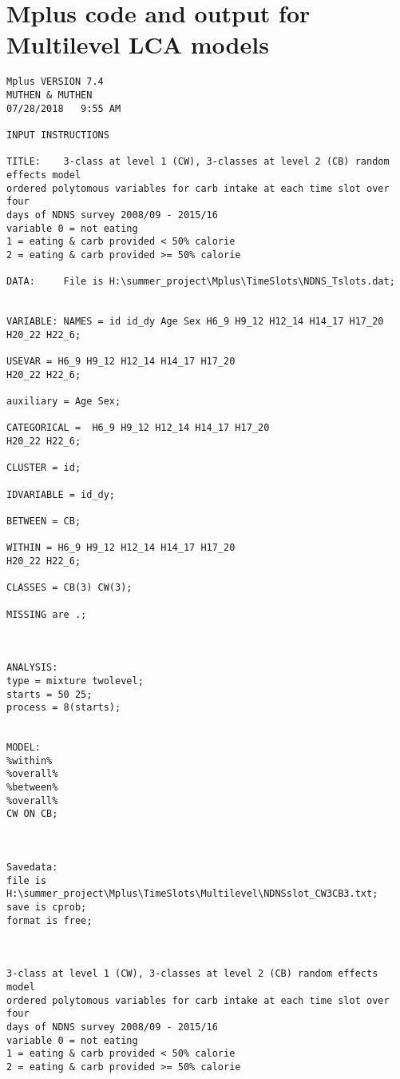 
\chapter{Mplus code and output for Multilevel LCA models} %

\label{AppendixB} %



\begin{verbatim}
Mplus VERSION 7.4
MUTHEN & MUTHEN
07/28/2018   9:55 AM

INPUT INSTRUCTIONS

TITLE:    3-class at level 1 (CW), 3-classes at level 2 (CB) random effects model 
ordered polytomous variables for carb intake at each time slot over four
days of NDNS survey 2008/09 - 2015/16
variable 0 = not eating
1 = eating & carb provided < 50% calorie
2 = eating & carb provided >= 50% calorie

DATA:     File is H:\summer_project\Mplus\TimeSlots\NDNS_Tslots.dat;


VARIABLE: NAMES = id id_dy Age Sex H6_9 H9_12 H12_14 H14_17 H17_20
H20_22 H22_6;

USEVAR = H6_9 H9_12 H12_14 H14_17 H17_20
H20_22 H22_6;

auxiliary = Age Sex;

CATEGORICAL =  H6_9 H9_12 H12_14 H14_17 H17_20
H20_22 H22_6;

CLUSTER = id;

IDVARIABLE = id_dy;

BETWEEN = CB;

WITHIN = H6_9 H9_12 H12_14 H14_17 H17_20
H20_22 H22_6;

CLASSES = CB(3) CW(3);

MISSING are .;



ANALYSIS:
type = mixture twolevel;
starts = 50 25;
process = 8(starts);


MODEL:
%within%
%overall%
%between%
%overall%
CW ON CB;



Savedata:
file is H:\summer_project\Mplus\TimeSlots\Multilevel\NDNSslot_CW3CB3.txt;
save is cprob;
format is free;



3-class at level 1 (CW), 3-classes at level 2 (CB) random effects model 
ordered polytomous variables for carb intake at each time slot over four
days of NDNS survey 2008/09 - 2015/16
variable 0 = not eating
1 = eating & carb provided < 50% calorie
2 = eating & carb provided >= 50% calorie


\end{verbatim}
